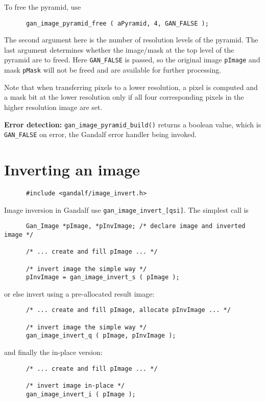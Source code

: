 To free the pyramid, use
\begin{verbatim}
      gan_image_pyramid_free ( aPyramid, 4, GAN_FALSE );
\end{verbatim}
The second argument here is the number of resolution levels of the pyramid.
The last argument determines whether the image/mask at the top level of
the pyramid are to freed. Here {\tt GAN\_FALSE} is passed, so the original
image {\tt pImage} and mask {\tt pMask} will not be freed and are available
for further processing.

Note that when transferring pixels to a lower resolution, a pixel is
computed and a mask bit at the lower resolution only if all four corresponding
pixels in the higher resolution image are set.

{\bf Error detection:} {\tt gan\_image\_pyramid\_build()} returns a boolean
value, which is {\tt GAN\_FALSE} on error, the Gandalf error handler being
invoked.

\section{Inverting an image}
\begin{verbatim}
      #include <gandalf/image_invert.h>
\end{verbatim}
Image inversion in Gandalf use {\tt gan\_image\_invert\_[qsi]}.
The simplest call is
\begin{verbatim}
      Gan_Image *pImage, *pInvImage; /* declare image and inverted image */

      /* ... create and fill pImage ... */

      /* invert image the simple way */
      pInvImage = gan_image_invert_s ( pImage );
\end{verbatim}
or else invert using a pre-allocated result image:
\begin{verbatim}
      /* ... create and fill pImage, allocate pInvImage ... */

      /* invert image the simple way */
      gan_image_invert_q ( pImage, pInvImage );
\end{verbatim}
and finally the in-place version:
\begin{verbatim}
      /* ... create and fill pImage ... */

      /* invert image in-place */
      gan_image_invert_i ( pImage );
\end{verbatim}

